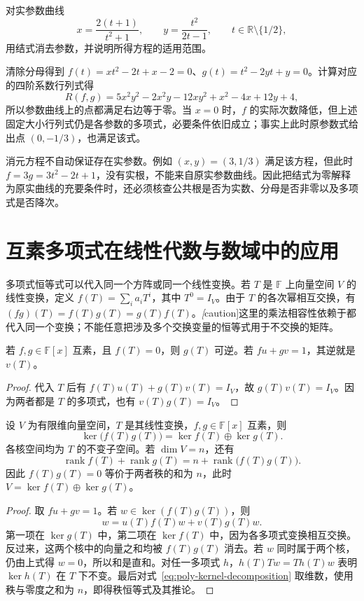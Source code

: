 \begin{example}
\label{ex:poly-resultant-elimination}
对实参数曲线
\[
    x=\frac{2(t+1)}{t^2+1},\qquad y=\frac{t^2}{2t-1},\qquad t\in\mathbb R\setminus\{1/2\},
\]
用结式消去参数，并说明所得方程的适用范围。
\end{example}
\begin{solve}
清除分母得到 $f(t)=xt^2-2t+x-2=0$、$g(t)=t^2-2yt+y=0$。计算对应的四阶系数行列式得
\[
    R(f,g)=5x^2y^2-2x^2y-12xy^2+x^2-4x+12y+4,
\]
所以参数曲线上的点都满足右边等于零。当 $x=0$ 时，$f$ 的实际次数降低，但上述固定大小行列式仍是各参数的多项式，必要条件依旧成立；事实上此时原参数式给出点 $(0,-1/3)$，也满足该式。

消元方程不自动保证存在实参数。例如 $(x,y)=(3,1/3)$ 满足该方程，但此时 $f=3g=3t^2-2t+1$，没有实根，不能来自原实参数曲线。因此把结式为零解释为原实曲线的充要条件时，还必须核查公共根是否为实数、分母是否非零以及多项式是否降次。
\end{solve}

\section{互素多项式在线性代数与数域中的应用}
\label{sec:poly-applications}

多项式恒等式可以代入同一个方阵或同一个线性变换。若 $T$ 是 $\mathbb F$ 上向量空间 $V$ 的线性变换，定义 $f(T)=\sum_i a_iT^i$，其中 $T^0=I_V$。由于 $T$ 的各次幂相互交换，有 $(fg)(T)=f(T)g(T)=g(T)f(T)$。\emph[caution]{这里的乘法相容性依赖于都代入同一个变换}；不能任意把涉及多个交换变量的恒等式用于不交换的矩阵。

\begin{proposition}
\label{prop:poly-matrix-inverse}
若 $f,g\in\mathbb F[x]$ 互素，且 $f(T)=0$，则 $g(T)$ 可逆。若 $fu+gv=1$，其逆就是 $v(T)$。
\end{proposition}
\begin{proof}
代入 $T$ 后有 $f(T)u(T)+g(T)v(T)=I_V$，故 $g(T)v(T)=I_V$。因为两者都是 $T$ 的多项式，也有 $v(T)g(T)=I_V$。
\end{proof}

\begin{theorem}[互素因子诱导的核分解]
\label{thm:poly-kernel-decomposition}
设 $V$ 为有限维向量空间，$T$ 是其线性变换，$f,g\in\mathbb F[x]$ 互素，则
\begin{equation}
\label{eq:poly-kernel-decomposition}
    \ker\bigl(f(T)g(T)\bigr)=\ker f(T)\oplus\ker g(T).
\end{equation}
各核空间均为 $T$ 的不变子空间。若 $\dim V=n$，还有
\[
    \operatorname{rank}f(T)+\operatorname{rank}g(T)
    =n+\operatorname{rank}\bigl(f(T)g(T)\bigr).
\]
因此 $f(T)g(T)=0$ 等价于两者秩的和为 $n$，此时 $V=\ker f(T)\oplus\ker g(T)$。
\end{theorem}
\begin{proof}
取 $fu+gv=1$。若 $w\in\ker(f(T)g(T))$，则
\[
    w=u(T)f(T)w+v(T)g(T)w.
\]
第一项在 $\ker g(T)$ 中，第二项在 $\ker f(T)$ 中，因为各多项式变换相互交换。反过来，这两个核中的向量之和均被 $f(T)g(T)$ 消去。若 $w$ 同时属于两个核，仍由上式得 $w=0$，所以和是直和。对任一多项式 $h$，$h(T)Tw=Th(T)w$ 表明 $\ker h(T)$ 在 $T$ 下不变。最后对式~\eqref{eq:poly-kernel-decomposition} 取维数，使用秩与零度之和为 $n$，即得秩恒等式及其推论。
\end{proof}

